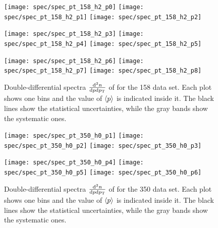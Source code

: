 \begin{figure}[!ht]
  \centering

  \texttt{[image: spec/spec\_pt\_158\_h2\_p0]}
  \texttt{[image: spec/spec\_pt\_158\_h2\_p1]}
  \texttt{[image: spec/spec\_pt\_158\_h2\_p2]}
  
  \texttt{[image: spec/spec\_pt\_158\_h2\_p3]}
  \texttt{[image: spec/spec\_pt\_158\_h2\_p4]}
  \texttt{[image: spec/spec\_pt\_158\_h2\_p5]}

  \texttt{[image: spec/spec\_pt\_158\_h2\_p6]}
  \texttt{[image: spec/spec\_pt\_158\_h2\_p7]}
  \texttt{[image: spec/spec\_pt\_158\_h2\_p8]}

  \caption{Double-differential spectra $\frac{\text{d}^2n}{\text{d}p\text{d}p_\text{T}}$
    of \kzeros for the 158 \GeVc data set. Each plot shows one \pp bins and the value
    of $\langle p\rangle$ is indicated inside it. The black lines show the statistical
    uncertainties, while the gray bands show the systematic ones.}
  \label{fig:hadron:spec:vzero:all158:h2}
\end{figure}


\begin{figure}[!ht]
  \centering

  \texttt{[image: spec/spec\_pt\_350\_h0\_p1]}
  \texttt{[image: spec/spec\_pt\_350\_h0\_p2]}
  \texttt{[image: spec/spec\_pt\_350\_h0\_p3]}

  \texttt{[image: spec/spec\_pt\_350\_h0\_p4]}
  \texttt{[image: spec/spec\_pt\_350\_h0\_p5]}
  \texttt{[image: spec/spec\_pt\_350\_h0\_p6]}

  \caption{Double-differential spectra $\frac{\text{d}^2n}{\text{d}p\text{d}p_\text{T}}$
    of \lamb for the 350 \GeVc data set. Each plot shows one \pp bins and the value
    of $\langle p\rangle$ is indicated inside it. The black lines show the statistical
    uncertainties, while the gray bands show the systematic ones.}
  \label{fig:hadron:spec:vzero:all350:h0}
\end{figure}


